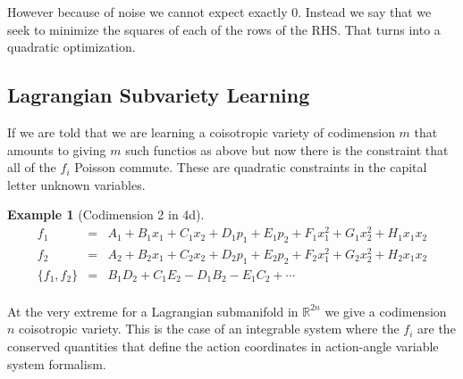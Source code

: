 \documentclass[a4paper,landscape]{article}
\theoremstyle{change}
\newtheorem{example}[equation]{Example}
\theoremstyle{nonumberplain}
\numberwithin{equation}{section}
\newcommand\setof[1]{\{ #1 \}}
\begin{document}
However because of noise we cannot expect exactly $0$. Instead we say that we seek to minimize the squares of each of the rows of the RHS. That turns into a quadratic optimization.

\subsection{Lagrangian Subvariety Learning}

If we are told that we are learning a coisotropic variety of codimension $m$ that amounts to giving $m$ such functios as above but now there is the constraint that all of the $f_i$ Poisson commute. These are quadratic constraints in the capital letter unknown variables.

\begin{example}[Codimension 2 in 4d]

\begin{eqnarray*}
f_1 &=& A_1 + B_1 x_1 + C_1 x_2 + D_1 p_1 + E_1 p_2 + F_1 x_1^2 + G_1 x_2^2 + H_1 x_1 x_2\\
f_2 &=& A_2 + B_2 x_1 + C_2 x_2 + D_2 p_1 + E_2 p_2 + F_2 x_1^2 + G_2 x_2^2 + H_2 x_1 x_2\\
\setof{ f_1 , f_2 } &=& B_1 D_2 + C_1 E_2 - D_1 B_2 - E_1 C_2 + \cdots\\
\end{eqnarray*}

\end{example}

At the very extreme for a Lagrangian submanifold in $\mathbb{R}^{2n}$ we give a codimension $n$ coisotropic variety. This is the case of an integrable system where the $f_i$ are the conserved quantities that define the action coordinates in action-angle variable system formalism.
\end{document}
